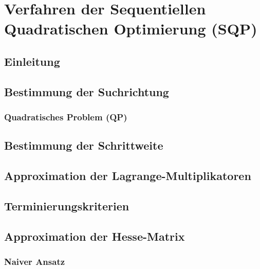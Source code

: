     \section{Verfahren der Sequentiellen Quadratischen Optimierung (SQP)} %

        \subsection{Einleitung} %

        \subsection{Bestimmung der Suchrichtung} %

            \subsubsection{Quadratisches Problem (QP)} %

        \subsection{Bestimmung der Schrittweite} %

        \subsection{Approximation der Lagrange-Multiplikatoren} %

        \subsection{Terminierungskriterien} %

        \subsection{Approximation der Hesse-Matrix} %

            \subsubsection{Naiver Ansatz} %

